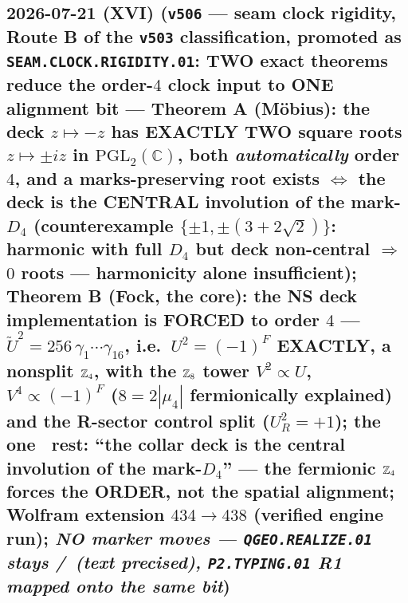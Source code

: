 \subsection*{2026-07-21 (XVI) (\texttt{v506} --- seam clock rigidity, Route B of the \texttt{v503} classification, promoted as \texttt{SEAM.CLOCK.RIGIDITY.01}: TWO exact theorems reduce the order-$4$ clock input to ONE alignment bit --- Theorem A (M\"obius): the deck $z\mapsto-z$ has EXACTLY TWO square roots $z\mapsto\pm iz$ in $\mathrm{PGL}_2(\mathbb C)$, both \emph{automatically} order $4$, and a marks-preserving root exists $\iff$ the deck is the CENTRAL involution of the mark-$D_4$ (counterexample $\{\pm1,\pm(3{+}2\sqrt2)\}$: harmonic with full $D_4$ but deck non-central $\Rightarrow$ $0$ roots --- harmonicity alone insufficient); Theorem B (Fock, the core): the NS deck implementation is FORCED to order $4$ --- $\tilde U^2=256\,\gamma_1\cdots\gamma_{16}$, i.e.\ $U^2=(-1)^F$ EXACTLY, a nonsplit $\mathbb{Z}_4$, with the $\mathbb{Z}_8$ tower $V^2\propto U$, $V^4\propto(-1)^F$ ($8=2|\mu_4|$ fermionically explained) and the R-sector control split ($U_R^2=+1$); the one \mC\ rest: ``the collar deck is the central involution of the mark-$D_4$'' --- the fermionic $\mathbb{Z}_4$ forces the ORDER, not the spatial alignment; Wolfram extension $434\to438$ (verified engine run); \emph{NO marker moves --- \texttt{QGEO.REALIZE.01} stays \mC/\mO\ (text precised), \texttt{P2.TYPING.01} R1 mapped onto the same bit})}
